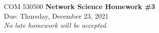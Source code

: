 \documentclass[12pt]{article}
\begin{document}
\thispagestyle{empty}
\begin{center}
{\Large \noindent COM 530500 {\bf Network Science Homework \#3} \\
\large {{\sc Due:} Thursday, December 23, 2021}  \\
}
\emph{No late homework will be accepted}.
\end{center}





\bigskip

\end{document}

